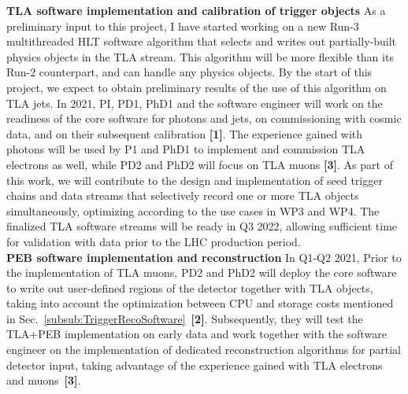 \textbf{TLA software implementation and calibration of trigger objects} As a preliminary input to this project, I have started working on a new Run-3 multithreaded HLT software algorithm that selects and writes out partially-built physics objects in the TLA stream. 
This algorithm will be more flexible than its Run-2 counterpart, and can handle any physics objects. 
By the start of this project, we expect to obtain preliminary results of the use of this algorithm on TLA jets. 
In 2021, PI, PD1, PhD1 and the software engineer
will work on the readiness of the core software for photons and jets, on commissioning with cosmic data, and on their subsequent calibration \textbf{[1]}.
The experience gained with photons will be used by P1 and PhD1 to implement and commission TLA electrons as well, while PD2 and PhD2 will focus on TLA muons \textbf{[3]}. 
As part of this work, we will contribute to the design and implementation of seed trigger chains and data streams that selectively record one or more TLA objects simultaneously, optimizing according to the use cases in WP3 and WP4. 
The finalized TLA software streams will be ready in Q3 2022, allowing sufficient time for validation with data prior to the LHC production period. \\
\textbf{PEB software implementation and reconstruction} In Q1-Q2 2021, Prior to the implementation of TLA muons, PD2 and PhD2 will deploy the core software to write out user-defined regions of the detector together with TLA objects, 
taking into account the optimization between CPU and storage costs mentioned in Sec.~\ref{subsub:TriggerRecoSoftware}~\textbf{[2]}. 
Subsequently, they will test the TLA+PEB implementation on early data and work together with the software engineer on the implementation of dedicated reconstruction algorithms for partial detector input, taking advantage of the experience gained with TLA electrons and muons~\textbf{[3]}. 
